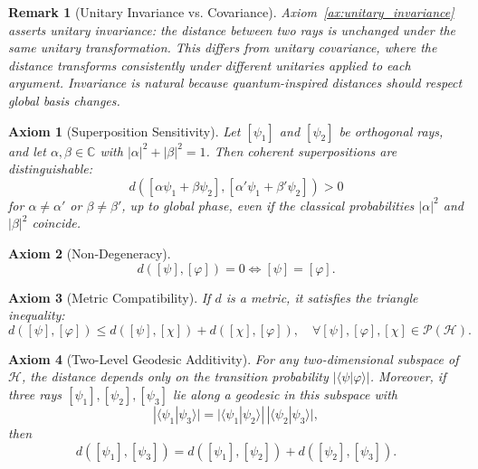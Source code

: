 \documentclass[aps,pra,reprint,nofootinbib,showpacs,superscriptaddress]{revtex4-1}
\newtheorem{axiom}{Axiom}[section]
\newtheorem{remark}[theorem]{Remark}
\newcommand{\Hilbert}{\mathcal{H}}
\newcommand{\Proj}{\mathcal{P}}
\begin{document}
\begin{remark}[Unitary Invariance vs. Covariance]
Axiom~\ref{ax:unitary_invariance} asserts \emph{unitary invariance}: the distance between two rays is unchanged under the same unitary transformation. This differs from \emph{unitary covariance}, where the distance transforms consistently under different unitaries applied to each argument. Invariance is natural because quantum-inspired distances should respect global basis changes.
\end{remark}

\begin{axiom}[Superposition Sensitivity]
\label{ax:superposition}
Let $[\psi_1]$ and $[\psi_2]$ be orthogonal rays, and let $\alpha, \beta \in \mathbb{C}$ with $|\alpha|^2 + |\beta|^2 = 1$. Then coherent superpositions are distinguishable:
\[
d([\alpha \psi_1 + \beta \psi_2], [\alpha' \psi_1 + \beta' \psi_2]) > 0
\]
for $\alpha \neq \alpha'$ or $\beta \neq \beta'$, up to global phase, even if the classical probabilities $|\alpha|^2$ and $|\beta|^2$ coincide.
\end{axiom}

\begin{axiom}[Non-Degeneracy]
\label{ax:nondegeneracy}
\[
d([\psi],[\varphi]) = 0 \iff [\psi] = [\varphi].
\]
\end{axiom}

\begin{axiom}[Metric Compatibility]
\label{ax:triangle}
If $d$ is a metric, it satisfies the triangle inequality:
\[
d([\psi],[\varphi]) \le d([\psi],[\chi]) + d([\chi],[\varphi]), \quad \forall [\psi],[\varphi],[\chi] \in \Proj(\Hilbert).
\]
\end{axiom}

\begin{axiom}[Two-Level Geodesic Additivity]
\label{ax:geodesic}
For any two-dimensional subspace of $\Hilbert$, the distance depends only on the transition probability $|\langle \psi|\varphi\rangle|$.  
Moreover, if three rays $[\psi_1],[\psi_2],[\psi_3]$ lie along a geodesic in this subspace with
\[
|\langle \psi_1|\psi_3\rangle| = |\langle \psi_1|\psi_2\rangle| \, |\langle \psi_2|\psi_3\rangle|,
\]
then
\[
d([\psi_1],[\psi_3]) = d([\psi_1],[\psi_2]) + d([\psi_2],[\psi_3]).
\]
\end{axiom}
\end{document}

